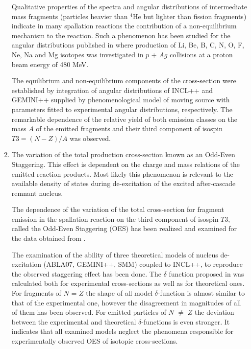\begin{enumerate}
\vspace{0.3cm}

Qualitative properties of the spectra and angular
distributions of intermediate mass fragments (particles heavier than
$^{4}$He but lighter than fission fragments)  indicate in
 many spallation reactions the contribution
of a non-equilibrium mechanism to the reaction. Such a phenomenon
has been studied  for the angular distributions published in \cite{Green1984}
where production of Li, Be, B, C, N, O, F, Ne, Na and Mg isotopes
was investigated in $p$ + $Ag$ collisions at a proton beam energy of
480 MeV.


The equilibrium and non-equilibrium components of the cross-section
were established by integration of angular distributions of
 INCL++ and GEMINI++ supplied by phenomenological model of moving source with
 parameters fitted to experimental angular distributions,
respectively. The remarkable dependence of the relative yield of
both emission classes on the mass $A$ of the emitted fragments and
their third component of isospin \( T3 = (N - Z) / A \) was
observed.

\item The variation of the total production cross-section known as an Odd-Even Staggering.
This effect is dependent on the charge and mass relations of the
emitted reaction products. Most likely this phenomenon is relevant
to the available density of states during de-excitation of the
excited after-cascade remnant nucleus.

\vspace{0.3cm}

The dependence of the variation of the total cross-section for
fragment emission in the spallation reaction on the third component
of isospin $T3$, called the Odd-Even Staggering (OES) has been
realized and examined for the data obtained from \cite{Green1984}.

The examination of the ability of three theoretical models of
nucleus de-excitation (ABLA07, GEMINI++, SMM) coupled to INCL++, to
reproduce the observed staggering effect has been done. The $\delta$
function proposed in \cite{Mei_OES} was calculated both for experimental
cross-sections as well as for theoretical ones. For fragments of $N$
= $Z$ the shape of all model $\delta$-function is almost similar to
that of the experimental one, however the disagreement in magnitudes of
all of them has been observed. For emitted particles of $N$ $\neq$
$Z$ the deviation between the experimental and theoretical
$\delta$-functions is even stronger. It indicates that all examined
models neglect the phenomena responsible for experimentally observed
OES of isotopic cross-sections.

\end{enumerate}




